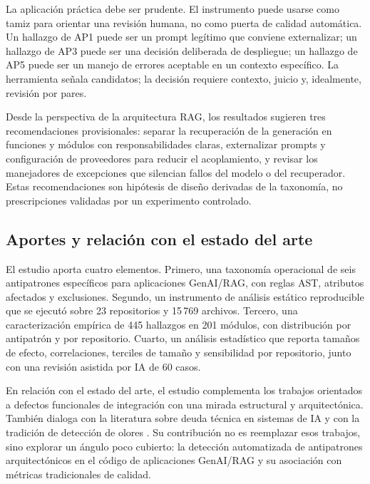 La aplicación práctica debe ser prudente. El instrumento puede usarse como tamiz para orientar una revisión humana, no como puerta de calidad automática. Un hallazgo de AP1 puede ser un prompt legítimo que conviene externalizar; un hallazgo de AP3 puede ser una decisión deliberada de despliegue; un hallazgo de AP5 puede ser un manejo de errores aceptable en un contexto específico. La herramienta señala candidatos; la decisión requiere contexto, juicio y, idealmente, revisión por pares.

Desde la perspectiva de la arquitectura RAG, los resultados sugieren tres recomendaciones provisionales: separar la recuperación de la generación en funciones y módulos con responsabilidades claras, externalizar prompts y configuración de proveedores para reducir el acoplamiento, y revisar los manejadores de excepciones que silencian fallos del modelo o del recuperador. Estas recomendaciones son hipótesis de diseño derivadas de la taxonomía, no prescripciones validadas por un experimento controlado.

\subsection{Aportes y relación con el estado del arte}

El estudio aporta cuatro elementos. Primero, una taxonomía operacional de seis antipatrones específicos para aplicaciones GenAI/RAG, con reglas AST, atributos afectados y exclusiones. Segundo, un instrumento de análisis estático reproducible que se ejecutó sobre 23 repositorios y 15\,769 archivos. Tercero, una caracterización empírica de 445 hallazgos en 201 módulos, con distribución por antipatrón y por repositorio. Cuarto, un análisis estadístico que reporta tamaños de efecto, correlaciones, terciles de tamaño y sensibilidad por repositorio, junto con una revisión asistida por IA de 60 casos.

En relación con el estado del arte, el estudio complementa los trabajos orientados a defectos funcionales de integración \cite{shao_are_2024,tan_lidl_2026} con una mirada estructural y arquitectónica. También dialoga con la literatura sobre deuda técnica en sistemas de IA \cite{sculley_hidden_2015,bogner_characterizing_2021,gesi_code_2022} y con la tradición de detección de olores \cite{garcia_identifying_2009,fowler_1999,palomba_diffuseness_2018}. Su contribución no es reemplazar esos trabajos, sino explorar un ángulo poco cubierto: la detección automatizada de antipatrones arquitectónicos en el código de aplicaciones GenAI/RAG y su asociación con métricas tradicionales de calidad.

